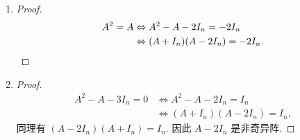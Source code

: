 \begin{enumerate}
\begin{proof}
\begin{align*}
                (A + I_n)^2 &= (A + I_n)(A + I_n) \\
                &= A^2 + A + A + I_n^2 \\
                &= I_n + A + A + I_n \\
                &= 2(A + I_n),   
            \end{align*}
            故
            \begin{align*}
                (A + I_n)^2 = 2(A + I_n) &\Leftrightarrow (A+I_n)(A+I_n) = 2I_n(A+I_n),
            \end{align*}
            由第 4 题可得
            \[
                A+I_n = 2I_n = I_n + I_n,   
            \]
            因此 $A = I_n$.
        \end{proof}
    \item %
        \begin{proof}
            \begin{align*}
                A^2=A &\Leftrightarrow A^2 - A - 2I_n = -2I_n \\
                &\Leftrightarrow (A+I_n)(A-2I_n) = -2I_n. \qedhere
            \end{align*}
        \end{proof}
    \item %
        \begin{proof}
            \begin{align*}
                A^2 - A - 3I_n = 0 &\Leftrightarrow A^2 - A - 2I_n = I_n \\
                &\Leftrightarrow (A+I_n)(A-2I_n) = I_n,
            \end{align*}
            同理有 $(A-2I_n)(A+I_n) = I_n$.
            因此 $A-2I_n$ 是非奇异阵.
        \end{proof}
\end{enumerate}
% 

